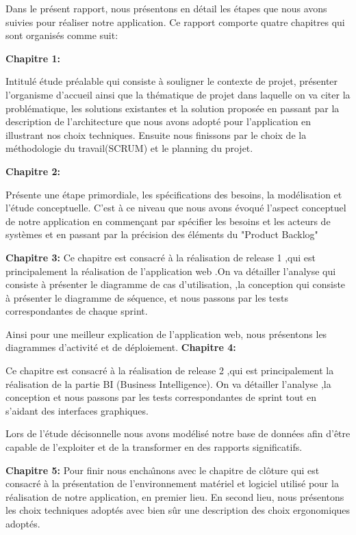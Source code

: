 \bigskip


Dans le pr\'{e}sent rapport, nous pr\'{e}sentons en d\'{e}tail les \'{e}tapes que nous avons
suivies pour r\'{e}aliser notre application. Ce rapport comporte quatre chapitres
qui sont organis\'{e}s comme suit:

\bigskip
\textbf{Chapitre 1:}

Intitul\'{e} \'{e}tude pr\'{e}alable qui consiste \`{a} souligner le contexte de projet,
pr\'{e}senter l'organisme d'accueil ainsi que la th\'{e}matique de projet dans
laquelle on va citer la probl\'{e}matique, les solutions existantes et la solution
propos\'{e}e en passant par la description de l'architecture que nous avons adopt\'{e} pour
l'application en illustrant nos choix techniques. Ensuite nous finissons
par le choix de la méthodologie du travail(SCRUM)  et le planning du projet.

\bigskip
\textbf{Chapitre 2:}

Pr\'{e}sente une \'{e}tape primordiale, les sp\'{e}cifications des besoins, la mod\'{e}lisation
et l'\'{e}tude conceptuelle. C'est \`{a} ce niveau que nous avons \'{e}voqu\'{e} l'aspect
conceptuel de notre application en commen\c{c}ant par sp\'{e}cifier les besoins et les
acteurs de syst\`{e}mes et en passant par la pr\'{e}cision des \'{e}l\'{e}ments du "Product Backlog"

\bigskip

\textbf{Chapitre 3:}
Ce chapitre est consacr\'{e} à la r\'{e}alisation de release 1 ,qui est principalement la r\'{e}alisation de l'application
web .On va d\'{e}tailler l'analyse qui consiste à pr\'{e}senter le 
diagramme de cas d'utilisation, ,la conception 
qui consiste à pr\'{e}senter le diagramme de s\'{e}quence,
et nous passons par les tests correspondantes de chaque sprint.

Ainsi pour une meilleur explication de l'application web, nous pr\'{e}sentons les diagrammes  
d'activit\'{e} et de d\'{e}ploiement.
\bigskip
\textbf{Chapitre 4:}

Ce chapitre est consacr\'{e} à la r\'{e}alisation de release 2 ,qui est principalement la r\'{e}alisation de la partie BI (Business Intelligence).
On va d\'{e}tailler l'analyse ,la conception et nous passons  par les tests correspondantes de sprint tout en s'aidant des
interfaces graphiques.

Lors de l'\'{e}tude décisonnelle nous avons mod\'{e}lis\'{e} notre base de donn\'{e}es afin d'\^{e}tre capable de
l'exploiter et de la transformer en des rapports significatifs.


\textbf{Chapitre 5:}
Pour finir nous encha\^{\i}nons avec le chapitre de cl\^{o}ture qui est consacr\'{e} \`{a} la
pr\'{e}sentation de l'environnement mat\'{e}riel et logiciel utilis\'{e} pour la r\'{e}alisation
de notre application, en premier lieu. En second lieu, nous  pr\'{e}sentons les
choix techniques adopt\'{e}s  avec bien s\^{u}r une
description des choix ergonomiques adopt\'{e}s.






